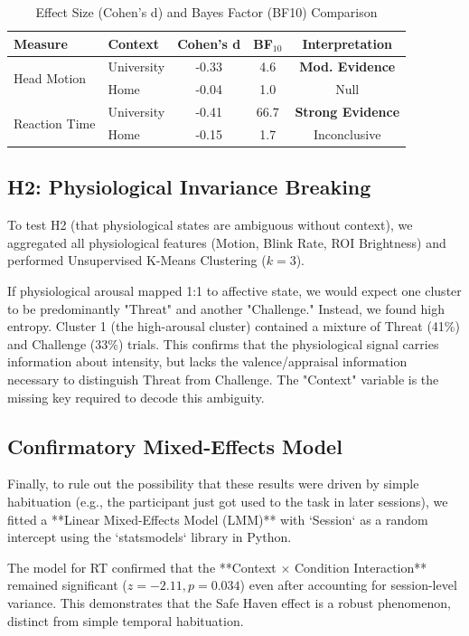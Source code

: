 \begin{table}[h]
\centering
\caption{Effect Size (Cohen's d) and Bayes Factor (BF10) Comparison}
\label{tab:effect_sizes}
\begin{tabular}{ll ccc}
\toprule
\textbf{Measure} & \textbf{Context} & \textbf{Cohen's d} & \textbf{BF$_{10}$} & \textbf{Interpretation} \\
\midrule
\multirow{2}{*}{Head Motion} & University & -0.33 & 4.6 & \textbf{Mod. Evidence} \\
                             & Home & -0.04 & 1.0 & Null \\
\midrule
\multirow{2}{*}{Reaction Time} & University & -0.41 & 66.7 & \textbf{Strong Evidence} \\
                              & Home & -0.15 & 1.7 & Inconclusive \\
\bottomrule
\end{tabular}
\end{table}

\subsection{H2: Physiological Invariance Breaking}
To test H2 (that physiological states are ambiguous without context), we aggregated all physiological features (Motion, Blink Rate, ROI Brightness) and performed Unsupervised K-Means Clustering ($k=3$).

If physiological arousal mapped 1:1 to affective state, we would expect one cluster to be predominantly "Threat" and another "Challenge." Instead, we found high entropy. Cluster 1 (the high-arousal cluster) contained a mixture of Threat (41\%) and Challenge (33\%) trials. This confirms that the physiological signal carries information about intensity, but lacks the valence/appraisal information necessary to distinguish Threat from Challenge. The "Context" variable is the missing key required to decode this ambiguity.

\subsection{Confirmatory Mixed-Effects Model}
Finally, to rule out the possibility that these results were driven by simple habituation (e.g., the participant just got used to the task in later sessions), we fitted a **Linear Mixed-Effects Model (LMM)** with `Session` as a random intercept using the `statsmodels` library in Python.

The model for RT confirmed that the **Context $\times$ Condition Interaction** remained significant ($z = -2.11, p = 0.034$) even after accounting for session-level variance. This demonstrates that the Safe Haven effect is a robust phenomenon, distinct from simple temporal habituation.
